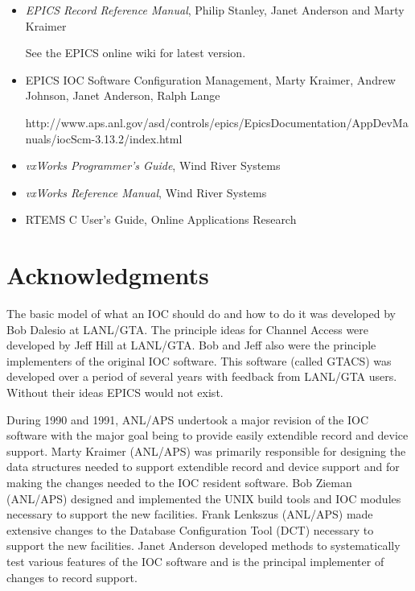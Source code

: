 \begin{itemize}
\item \emph{EPICS Record Reference Manual}, Philip Stanley, Janet Anderson and Marty Kraimer

See the EPICS online wiki for latest version.

\item EPICS IOC Software Configuration Management, Marty Kraimer, Andrew Johnson, Janet Anderson, Ralph Lange 

http://www.aps.anl.gov/asd/controls/epics/EpicsDocumentation/AppDevManuals/iocScm-3.13.2/index.html

\item \emph{vxWorks Programmer's Guide}, Wind River Systems

\item \emph{vxWorks Reference Manual}, Wind River Systems

\item RTEMS C User's Guide, Online Applications Research 

\end{itemize}

\section{Acknowledgments}

The basic model of what an IOC should do and how to do it was developed by Bob Dalesio at LANL/GTA. The principle 
ideas for Channel Access were developed by Jeff Hill at LANL/GTA. Bob and Jeff also were the principle implementers 
of the original IOC software. This software (called GTACS) was developed over a period of several years with feedback 
from LANL/GTA users. Without their ideas EPICS would not exist.

During 1990 and 1991, ANL/APS undertook a major revision of the IOC software with the major goal being to provide 
easily extendible record and device support. Marty Kraimer (ANL/APS) was primarily responsible for designing the data 
structures needed to support extendible record and device support and for making the changes needed to the IOC resident 
software. Bob Zieman (ANL/APS) designed and implemented the UNIX build tools and IOC modules necessary to 
support the new facilities. Frank Lenkszus (ANL/APS) made extensive changes to the Database Configuration Tool 
(DCT) necessary to support the new facilities. Janet Anderson developed methods to systematically test various features 
of the IOC software and is the principal implementer of changes to record support.

